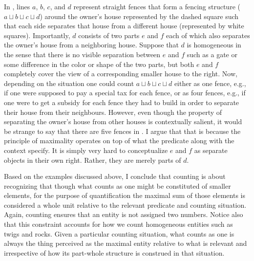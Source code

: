 In , lines $a$, $b$, $c$, and $d$ represent straight fences that form a fencing structure ($a\sqcup b\sqcup c\sqcup d$) around the owner's house represented by the dashed square such that each side separates
that house from a different house (represented by white squares). Importantly, $d$ consists of two parts $e$ and $f$ each of which also separates the owner's house from a neighboring house. Suppose that $d$ is homogeneous in the sense that there is no visible separation between $e$ and $f$ such as a gate or some difference in the color or shape of the two parts, but both $e$ and $f$ completely cover the view of a corresponding smaller house to the right. Now, depending on the situation one could count $a\sqcup b\sqcup c\sqcup d$ either as one fence, e.g., if one were supposed to pay a special tax for each fence, or as four fences, e.g., if one were to get a subsidy for each fence they had to build in order to separate their house from their neighbours. However, even though the property of separating the owner's house from other houses is contextually salient, it would be strange to say that there are five fences in . I argue that that is because the principle of maximality operates on top of what the predicate along with the context specify. It is simply very hard to conceptualize $e$ and $f$ as separate objects in their own right. Rather, they are merely parts of $d$. 

Based on the examples discussed above, I conclude that counting is about recognizing that though what counts as one might be constituted of smaller elements, for the purpose of quantification the maximal sum of those elements is considered a whole unit relative to the relevant predicate and counting situation. Again, counting ensures that an entity is not assigned two numbers. Notice also that this constraint accounts for how we count homogeneous entities such as twigs and rocks. Given a particular counting situation, what counts as one is always the thing perceived as the maximal entity relative to what is relevant and irrespective of how its part-whole structure is construed in that situation.

